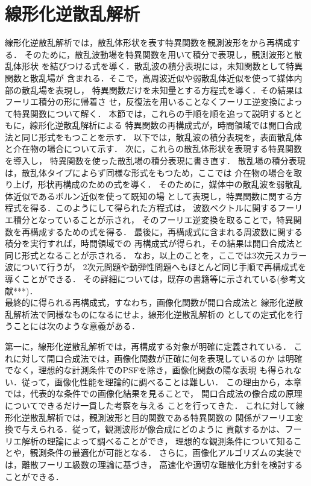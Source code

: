\section{線形化逆散乱解析}
線形化逆散乱解析では，散乱体形状を表す特異関数を観測波形をから再構成する．
そのために，散乱波動場を特異関数を用いて積分で表現し，観測波形と散乱体形状
を結びつける式を導く．散乱波の積分表現には，未知関数として特異関数と散乱場が
含まれる．そこで，高周波近似や弱散乱体近似を使って媒体内部の散乱場を表現し，
特異関数だけを未知量とする方程式を導く．その結果はフーリエ積分の形に帰着さ
せ，反復法を用いることなくフーリエ逆変換によって特異関数について解く．
本節では，これらの手順を順を追って説明するとともに，線形化逆散乱解析による
特異関数の再構成式が，時間領域では開口合成法と同じ形式をもつことを示す．
以下では，散乱波の積分表現を，表面散乱体と介在物の場合について示す．
次に，これらの散乱体形状を表現する特異関数を導入し，
特異関数を使った散乱場の積分表現に書き直す．
散乱場の積分表現は，散乱体タイプによらず同様な形式をもつため，ここでは
介在物の場合を取り上げ，形状再構成のための式を導く．
そのために，媒体中の散乱波を弱散乱体近似であるボルン近似を使って既知の場
として表現し，特異関数に関する方程式を得る．このようにして得られた方程式は，
波数ベクトルに関するフーリエ積分となっていることが示され，
そのフーリエ逆変換を取ることで，特異関数を再構成するための式を得る．
最後に，再構成式に含まれる周波数に関する積分を実行すれば，時間領域での
再構成式が得られ，その結果は開口合成法と同じ形式となることが示される．
なお，以上のことを，ここでは3次元スカラー波について行うが，
2次元問題や動弾性問題へもほとんど同じ手順で再構成式を導くことができる．
その詳細については，既存の書籍等に示されている(参考文献***)．
\\
最終的に得られる再構成式，すなわち，画像化関数が開口合成法と
線形化逆散乱解析法で同様なものになるにせよ，線形化逆散乱解析の
としての定式化を行うことには次のような意義がある．

第一に，線形化逆散乱解析では，再構成する対象が明確に定義されている．
これに対して開口合成法では，画像化関数が正確に何を表現しているのか
は明確でなく，理想的な計測条件でのPSFを除き，画像化関数の陽な表現
も得られない．従って，画像化性能を理論的に調べることは難しい．
この理由から，本章では，代表的な条件での画像化結果を見ることで，
開口合成法の像合成の原理についてできるだけ一貫した考察を与える
ことを行ってきた．
これに対して線形化逆散乱解析では，観測波形と目的関数である特異関数の
関係がフーリエ変換で与えられる．従って，観測波形が像合成にどのように
貢献するかは、フーリエ解析の理論によって調べることができ，
理想的な観測条件について知ることや，観測条件の最適化が可能となる．
さらに，画像化アルゴリズムの実装では，離散フーリエ級数の理論に基づき，
高速化や適切な離散化方針を検討することができる．

